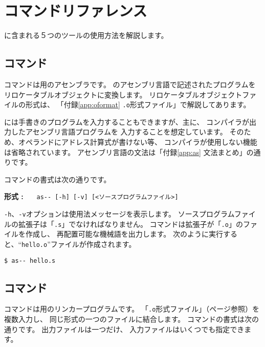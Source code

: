 % 
%
\chapter{コマンドリファレンス}

\util に含まれる５つのツールの使用方法を解説します。

\section{{\as}コマンド}

{\as}コマンドは{\tac}用のアセンブラです。
{\tac}のアセンブリ言語で記述されたプログラムを
リロケータブルオブジェクトに変換します。
リロケータブルオブジェクトファイルの形式は、
「付録\ref{app:oformat} \verb/.o/形式ファイル」で解説してあります。

{\as}には手書きのプログラムを入力することもできますが、主に、
{\cmm}コンパイラが出力したアセンブリ言語プログラムを
入力することを想定しています。
そのため、オペランドにアドレス計算式が書けない等、
{\cmm}コンパイラが使用しない機能は省略されています。
{\tac}アセンブリ言語の文法は「付録\ref{app:as} \as 文法まとめ」の通りです。

{\as}コマンドの書式は次の通りです。

\begin{flushleft}
{\bf 形式 : }~~~\verb/as-- [-h] [-v] [<ソースプログラムファイル>]/
\end{flushleft}

\verb/-h/、\verb/-v/オプションは使用法メッセージを表示します。
ソースプログラムファイルの拡張子は「\verb/.s/」でなければなりません。
{\as}コマンドは拡張子が「\verb/.o/」のファイルを作成し、
再配置可能な機械語を出力します。
次のように実行すると、``\verb/hello.o/''ファイルが作成されます。

\begin{mylist}
\begin{verbatim}
$ as-- hello.s
\end{verbatim}
\end{mylist}

\section{{\ld}コマンド}

{\ld}コマンドは{\tac}用のリンカープログラムです。
「\verb/.o/形式ファイル」（\pageref{app:oformat}ページ参照）を複数入力し、
同じ形式の一つのファイルに結合します。
{\ld}コマンドの書式は次の通りです。
出力ファイルは一つだけ、
入力ファイルはいくつでも指定できます。

